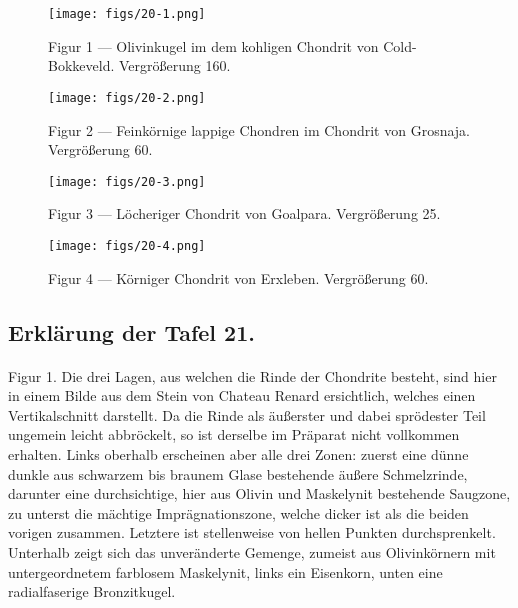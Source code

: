 \documentclass[a4paper, 11pt, oneside, polutonikogreek, german]{article}
\begin{document}
\vspace*{\fill}
\begin{figure}[H]
\centering
\texttt{[image: figs/20-1.png]}
\caption{\small Figur 1 --- Olivinkugel im dem kohligen Chondrit von Cold-Bokkeveld. Vergrößerung 160.}
\end{figure}
\vspace*{\fill}
\clearpage

\vspace*{\fill}
\begin{figure}[H]
\centering
\texttt{[image: figs/20-2.png]}
\caption{\small Figur 2 --- Feinkörnige lappige Chondren im Chondrit von Grosnaja. Vergrößerung 60.}
\end{figure}
\vspace*{\fill}
\clearpage

\vspace*{\fill}
\begin{figure}[H]
\centering
\texttt{[image: figs/20-3.png]}
\caption{\small Figur 3 --- Löcheriger Chondrit von Goalpara. Vergrößerung 25.}
\end{figure}
\vspace*{\fill}
\clearpage

\vspace*{\fill}
\begin{figure}[H]
\centering
\texttt{[image: figs/20-4.png]}
\caption{\small Figur 4 --- Körniger Chondrit von Erxleben. Vergrößerung 60.}
\end{figure}
\vspace*{\fill}
\clearpage

\subsection{Erklärung der Tafel 21.}
\paragraph{}
Figur 1. Die drei Lagen, aus welchen die Rinde der Chondrite besteht, sind hier in einem Bilde aus dem Stein von Chateau Renard ersichtlich, welches einen Vertikalschnitt darstellt. Da die Rinde als äußerster und dabei sprödester Teil ungemein leicht abbröckelt, so ist derselbe im Präparat nicht vollkommen erhalten. Links oberhalb erscheinen aber alle drei Zonen: zuerst eine dünne dunkle aus schwarzem bis braunem Glase bestehende äußere Schmelzrinde, darunter eine durchsichtige, hier aus Olivin und Maskelynit bestehende Saugzone, zu unterst die mächtige Imprägnationszone, welche dicker ist als die beiden vorigen zusammen. Letztere ist stellenweise von hellen Punkten durchsprenkelt. Unterhalb zeigt sich das unveränderte Gemenge, zumeist aus Olivinkörnern mit untergeordnetem farblosem Maskelynit, links ein Eisenkorn, unten eine radialfaserige Bronzitkugel.
\end{document}

